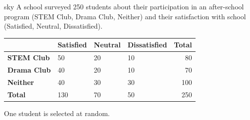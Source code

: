 \documentclass[10pt]{article}
\begin{document}
\namepartnerperiod

\vspace{0.1in}

\begin{scenariobox}[Context]{sky}
\small
A school surveyed 250 students about their participation in an after-school program
(STEM Club, Drama Club, Neither) and their satisfaction with school (Satisfied, Neutral, Dissatisfied).

\vspace{6pt}
\renewcommand{\arraystretch}{1.4}
\begin{tabularx}{\linewidth}{@{} l X X X r @{}}
 & \textbf{Satisfied} & \textbf{Neutral} & \textbf{Dissatisfied} & \textbf{Total} \\
\hline
\textbf{STEM Club}  & 50 & 20 & 10 & 80  \\
\textbf{Drama Club} & 40 & 20 & 10 & 70  \\
\textbf{Neither}    & 40 & 30 & 30 & 100 \\
\hline
\textbf{Total}      & 130 & 70 & 50 & 250 \\
\end{tabularx}

\vspace{4pt}
One student is selected at random.
\end{scenariobox}

\vspace{0.1in}
\end{document}
